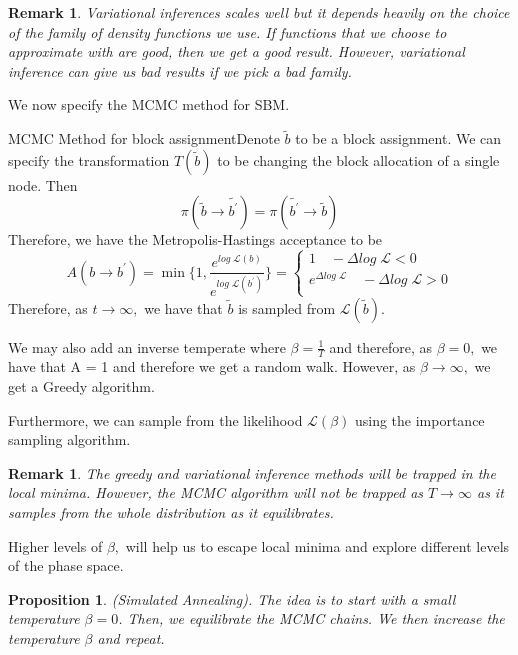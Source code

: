 \documentclass[twoside]{article}
\newtheorem{proposition}[theorem]{Proposition}
\newtheorem{remark}[theorem]{Remark}
\begin{document}
\begin{remark}Variational inferences scales well but it depends heavily on the choice of the family of density functions we use. If functions that we choose to approximate with are good, then we get a good result. However, variational inference can give us bad results if we pick a bad family.
\end{remark}

We now specify the MCMC method for SBM.

\begin{proposition_exam}{MCMC Method for block assignment}{}Denote $\tilde{b}$ to be a block assignment. We can specify the transformation $T(\tilde{b})$ to be changing the block allocation of a single node. Then 
$$
\pi(\tilde{b} \rightarrow \tilde{b^{'}}) = \pi(\tilde{b^{'}} \rightarrow \tilde{b})
$$
Therefore, we have the Metropolis-Hastings acceptance to be 
$$
A(b \rightarrow b^{'}) = 
\min \{1, \frac{e^{log\;\mathcal{L}(b)}}{e^{log\;\mathcal{L}(b^{'})}} \}
= 
\begin{cases}
1 \quad -\Delta log\;\mathcal{L} < 0 \\
e^{\Delta log\;\mathcal{L}} \quad -\Delta log\;\mathcal{L} > 0 \\
\end{cases}
$$
Therefore, as $t \rightarrow \infty,$ we have that $\tilde{b}$ is sampled from $\mathcal{L}(\tilde{b}).$
\end{proposition_exam}

We may also add an inverse temperate where $\beta = \frac{1}{T}$ and therefore, as $\beta = 0,$ we have that A = 1 and therefore we get a random walk. However, as $\beta \rightarrow \infty,$ we get a Greedy algorithm.

Furthermore, we can sample from the likelihood $\mathcal{L}(\beta)$ using the importance sampling algorithm.


\begin{remark}The greedy and variational inference methods will be trapped in the local minima. However, the MCMC algorithm will not be trapped as $T \rightarrow \infty$ as it samples from the whole distribution as it equilibrates. 
\end{remark}

Higher levels of $\beta,$ will help us to escape local minima and explore different levels of the phase space.
\begin{proposition}(Simulated Annealing). The idea is to start with a small temperature $\beta = 0$. Then, we equilibrate the MCMC chains. We then increase the temperature $\beta$ and repeat.
\end{proposition}
\end{document}

